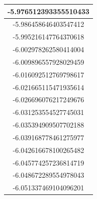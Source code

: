 \documentclass[a4paper]{article}
\begin{document}
\begin{table}[H]
\begin{multicols}{3}
\begin{tabular}{|c|}
-5.976512393355510433 \\ \hline
-5.986458646403547412 \\ \hline
-5.995216147764370618 \\ \hline
-6.002978262580414004 \\ \hline
-6.009896557928029459 \\ \hline
-6.016092512769798617 \\ \hline
-6.021665115471935614 \\ \hline
-6.026696076217249676 \\ \hline
-6.031253554527745031 \\ \hline
-6.035394909507702188 \\ \hline
-6.039168778461275977 \\ \hline
-6.042616678100265482 \\ \hline
-6.045774257236814719 \\ \hline
-6.048672289554978043 \\ \hline
-6.051337469104096201 \\ \hline

\end{tabular}

\columnbreak


\end{multicols}
\end{table}
\end{document}
